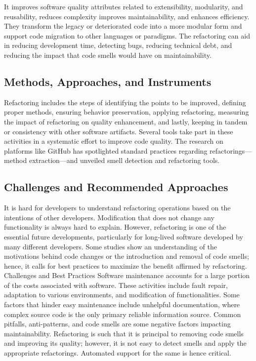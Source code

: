 It improves software quality attributes related to extensibility, modularity, and reusability, reduces complexity improves maintainability, and enhances efficiency. They transform the legacy or deteriorated code into a more modular form and support code migration to other languages or paradigms. The refactoring can aid in reducing development time, detecting bugs, reducing technical debt, and reducing the impact that code smells would have on maintainability.

\subsection{Methods, Approaches, and Instruments}

Refactoring includes the steps of identifying the points to be improved, defining proper methods, ensuring behavior preservation, applying refactoring, measuring the impact of refactoring on quality enhancement, and lastly, keeping in tandem or consistency with other software artifacts. Several tools take part in these activities in a systematic effort to improve code quality. The research on platforms like GitHub has spotlighted standard practices regarding refactorings—method extraction—and unveiled smell detection and refactoring tools.

\subsection{Challenges and Recommended Approaches}

It is hard for developers to understand refactoring operations based on the intentions of other developers. Modification that does not change any functionality is always hard to explain. However, refactoring is one of the essential future developments, particularly for long-lived software developed by many different developers. Some studies show an understanding of the motivations behind code changes or the introduction and removal of code smells; hence, it calls for best practices to maximize the benefit affirmed by refactoring. Challenges and Best Practices Software maintenance accounts for a large portion of the costs associated with software. These activities include fault repair, adaptation to various environments, and modification of functionalities. Some factors that hinder easy maintenance include unhelpful documentation, where complex source code is the only primary reliable information source. Common pitfalls, anti-patterns, and code smells are some negative factors impacting maintainability. Refactoring is such that it is principal to removing code smells and improving its quality; however, it is not easy to detect smells and apply the appropriate refactorings. Automated support for the same is hence critical.



